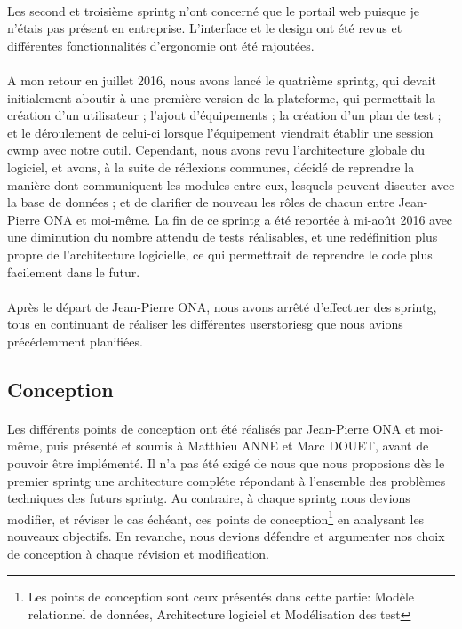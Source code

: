 \documentclass[12pt,a4paper]{report}
\begin{document}
\paragraph*{}Les second et troisième \gls{sprintg} n’ont concerné que le portail web
puisque je n’étais pas présent en entreprise. L’interface et le design ont été revus et différentes fonctionnalités d’ergonomie ont été rajoutées.
\paragraph*{} A mon retour en juillet 2016, nous avons lancé le quatrième \gls{sprintg}, qui devait initialement aboutir à une première version de la plateforme, qui permettait la création d’un utilisateur ; l’ajout d’équipements ; la création d’un plan de test ; et le déroulement de celui-ci lorsque l’équipement viendrait établir une session \gls{cwmp} avec notre outil. Cependant, nous avons revu l’architecture globale du logiciel, et avons, à la suite de réflexions communes, décidé de reprendre la manière dont communiquent les modules entre eux, lesquels peuvent discuter avec la base de données ; et de clarifier de nouveau les rôles de chacun entre Jean-Pierre ONA et moi-même. La fin de ce \gls{sprintg} a été reportée à mi-août 2016 avec une diminution du nombre attendu de tests réalisables, et une redéfinition plus propre de l’architecture logicielle, ce qui permettrait de reprendre le code plus facilement dans le futur.
\paragraph*{}Après le départ de Jean-Pierre ONA, nous avons arrêté d'effectuer des \gls{sprintg}, tous en continuant de réaliser les différentes \gls{userstoriesg} que nous avions précédemment planifiées. \\

\subsection{Conception} 
\paragraph*{}Les différents points de conception ont été réalisés par Jean-Pierre ONA et moi-même, puis présenté et soumis à Matthieu ANNE et Marc DOUET, avant de pouvoir être implémenté. Il n'a pas été exigé de nous que nous proposions dès le premier \gls{sprintg} une architecture compléte répondant à l'ensemble des problèmes techniques des futurs \gls{sprintg}. Au contraire, à chaque \gls{sprintg} nous devions  modifier, et réviser le cas échéant, ces points de conception\footnote{Les points de conception sont ceux présentés dans cette partie: Modèle relationnel de données, Architecture logiciel et Modélisation des test} en analysant les nouveaux objectifs. En revanche, nous devions défendre et argumenter nos choix de conception à chaque révision et modification.
\end{document}
